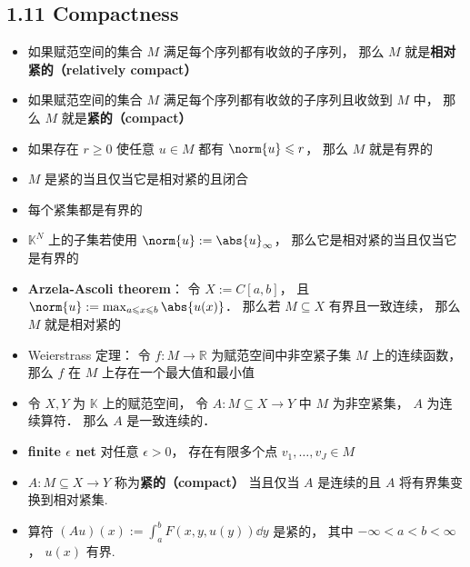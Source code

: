 \subsection{1.11 Compactness}
\begin{itemize}
\item 如果赋范空间的集合 $M$ 满足每个序列都有收敛的子序列， 那么 $M$ 就是\textbf{相对紧的（relatively compact）}

\item 如果赋范空间的集合 $M$ 满足每个序列都有收敛的子序列且收敛到 $M$ 中， 那么 $M$ 就是\textbf{紧的（compact）}

\item 如果存在 $r \geqslant 0$ 使任意 $u \in M$ 都有 $\norm{u} \leqslant r$， 那么 $M$ 就是有界的

\item $M$ 是紧的当且仅当它是相对紧的且闭合

\item 每个紧集都是有界的

\item $\mathbb K^N$ 上的子集若使用 $\norm{u} := \abs{u}_\infty$， 那么它是相对紧的当且仅当它是有界的

\item \textbf{Arzela-Ascoli theorem}： 令 $X := C[a, b]$， 且 $\norm{u} := \max_{a\leqslant x\leqslant b}\abs{u(x)}$． 那么若 $M \subseteq X$ 有界且一致连续， 那么 $M$ 就是相对紧的

\item Weierstrass 定理： 令 $f: M\to \mathbb R$ 为赋范空间中非空紧子集 $M$ 上的连续函数， 那么 $f$ 在 $M$ 上存在一个最大值和最小值

\item 令 $X, Y$ 为 $\mathbb K$ 上的赋范空间， 令 $A: M \subseteq X \to Y$ 中 $M$ 为非空紧集， $A$ 为连续算符． 那么 $A$ 是一致连续的．

\item \textbf{finite $\epsilon$ net} 对任意 $\epsilon > 0$， 存在有限多个点 $v_1, \dots, v_J \in M$ 

\item $A: M \subseteq X \to Y$ 称为\textbf{紧的（compact）} 当且仅当 $A$ 是连续的且 $A$ 将有界集变换到相对紧集.

\item 算符 $(Au)(x) := \int_a^b F(x, y, u(y)) \dd{y}$ 是紧的， 其中 $-\infty < a < b < \infty$， $u(x)$ 有界.
\end{itemize}

